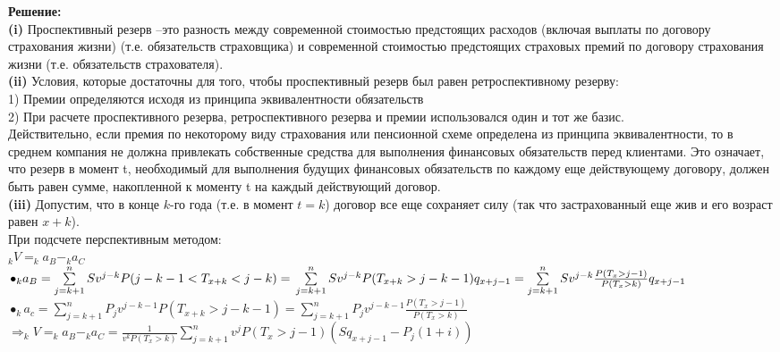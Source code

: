 \documentclass{article}
\begin{document}
{\bf \large Решение:}\\

 {\bf \large  (i)} Проспективный резерв –это   разность между  современной стоимостью предстоящих расходов (включая выплаты по договору страхования жизни) 
  (т.е. обязательств страховщика)  и   современной стоимостью предстоящих страховых премий по договору страхования жизни (т.е. обязательств страхователя).\\
  
  {\bf \large  (ii)} Условия, которые достаточны для того, чтобы проспективный резерв был равен ретроспективному резерву:\\
  1) Премии определяются исходя из принципа эквивалентности обязательств\\
  2) При расчете проспективного резерва, ретроспективного  резерва и премии использовался один и тот же базис.\\
 Действительно, если  премия по некоторому виду страхования или пенсионной схеме определена из принципа эквивалентности, то в среднем компания не должна 
 привлекать собственные средства для выполнения финансовых   обязательств перед клиентами. Это означает, что резерв в момент t, необходимый для выполнения 
 будущих финансовых обязательств по каждому еще действующему договору, должен быть равен сумме, накопленной к моменту t на каждый действующий договор.\\
 
 {\bf \large  (iii)} Допустим, что в конце $k$-го года (т.е. в момент $t = k$) договор все еще сохраняет силу (так что застрахованный еще жив и его возраст равен $x+k$).\\
 
При подсчете перспективным методом:\\
$_{k}V = _{k}a_{B} - _{k}a_{C}$\\

$ \bullet _{k}a_{B} = \sum\limits_{j=k+1}^{n}   Sv^{j-k}P(j-k-1 < T_{x+k} < j-k)  = \\
\sum\limits_{j=k+1}^{n}   Sv^{j-k}P(T_{x+k} > j-k-1) q_{x+j-1} =  \sum\limits_{j=k+1}^{n}   Sv^{j-k}  \frac {P(T_{x} >  j-1)}  { P(T_{x} > k)} q_{x+j-1}$\\

$ \bullet _{k}a_{c} = \sum\limits_{j=k+1}^{n}   P_{j} v^{j-k-1}P( T_{x+k} >  j-k-1)  =  \sum\limits_{j=k+1}^{n}   P_{j} v^{j-k-1}  \frac {P(T_{x} >  j-1)}  { P(T_{x} > k)} $\\

$\Rightarrow _{k}V = _{k}a_{B} - _{k}a_{C} = \frac{1}{v^{k}P(T_{x} >k) } \sum\limits_{j=k+1}^{n} v^{j}P(T_{x} > j-1) (Sq_{x+j-1} - P_{j}(1+i))$\\
\end{document}
